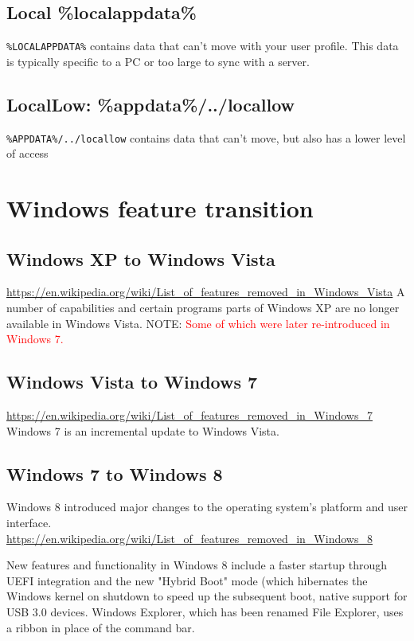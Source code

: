 \subsection{Local \%localappdata\%}

\verb!%LOCALAPPDATA%!
contains data that can't move with your user profile. This data is typically
specific to a PC or too large to sync with a server.

\subsection{LocalLow: \%appdata\%/../locallow}

\verb!%APPDATA%/../locallow!
contains data that can't move, but also has a lower level of access




\section{Windows feature transition}


\subsection{Windows XP to Windows Vista}

\url{https://en.wikipedia.org/wiki/List_of_features_removed_in_Windows_Vista}
A number of capabilities and certain programs
parts of Windows XP are no longer available in Windows Vista.
NOTE: \textcolor{red}{Some of which were later re-introduced in Windows 7.} 

\subsection{Windows Vista to Windows 7}

\url{https://en.wikipedia.org/wiki/List_of_features_removed_in_Windows_7}
Windows 7 is an incremental update to Windows Vista.
 

\subsection{Windows 7 to Windows 8}

Windows 8 introduced major changes to the operating system's platform and user
interface.
\url{https://en.wikipedia.org/wiki/List_of_features_removed_in_Windows_8}

New features and functionality in Windows 8 include a faster startup through
UEFI integration and the new "Hybrid Boot" mode (which hibernates the Windows
kernel on shutdown to speed up the subsequent boot,
native support for USB 3.0 devices.
Windows Explorer, which has been renamed File Explorer,
uses a ribbon in place of the command bar.

